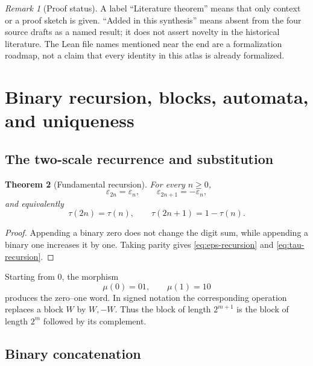 \documentclass[11pt,oneside]{article}
\numberwithin{equation}{section}
\newtheorem{theorem}{Theorem}[section]
\theoremstyle{definition}
\theoremstyle{remark}
\newtheorem{remark}[theorem]{Remark}
\newcommand{\eps}{\varepsilon}
\newcommand{\TM}{\tau}
\begin{document}
\begin{remark}[Proof status]
A label ``Literature theorem'' means that only context or a proof sketch is
given.  ``Added in this synthesis'' means absent from the four source drafts
as a named result; it does not assert novelty in the historical literature.
The Lean file names mentioned near the end are a formalization roadmap, not a
claim that every identity in this atlas is already formalized.
\end{remark}

\section{Binary recursion, blocks, automata, and uniqueness}
\label{sec:binary}

\subsection{The two-scale recurrence and substitution}

\begin{theorem}[Fundamental recursion]
For every \(n\ge0\),
\begin{equation}
 \boxed{\eps_{2n}=\eps_n,\qquad \eps_{2n+1}=-\eps_n,}
 \label{eq:eps-recursion}
\end{equation}
and equivalently
\begin{equation}
 \TM(2n)=\TM(n),\qquad \TM(2n+1)=1-\TM(n).
 \label{eq:tau-recursion}
\end{equation}
\end{theorem}

\begin{proof}
Appending a binary zero does not change the digit sum, while appending a
binary one increases it by one.  Taking parity gives
\eqref{eq:eps-recursion} and \eqref{eq:tau-recursion}.
\end{proof}

Starting from \(0\), the morphism
\begin{equation}
 \mu(0)=01,\qquad \mu(1)=10
 \label{eq:morphism}
\end{equation}
produces the zero--one word.  In signed notation the corresponding operation
replaces a block \(W\) by \(W,-W\).  Thus the block of length \(2^{m+1}\) is
the block of length \(2^m\) followed by its complement.

\subsection{Binary concatenation}
\end{document}
